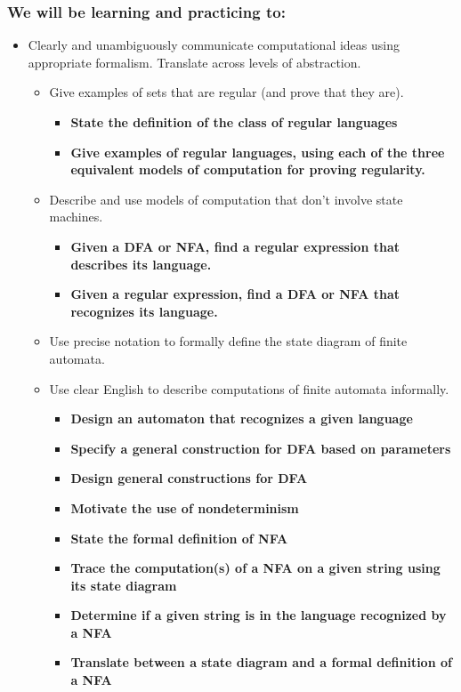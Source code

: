 \documentclass[12pt, oneside]{article}
\begin{document}
\subsubsection*{We will be learning and practicing to:}
\begin{itemize}
\item Clearly and unambiguously communicate computational ideas using appropriate formalism. Translate across levels of abstraction.
\begin{itemize}
   \item Give examples of sets that are regular (and prove that they are).
   \begin{itemize}
      \item {\bf State the definition of the class of regular languages}
      \item {\bf Give examples of regular languages, using each of the three equivalent models of computation for proving regularity.}
   \end{itemize}
   \item Describe and use models of computation that don't involve state machines.
   \begin{itemize}
      \item {\bf Given a DFA or NFA, find a regular expression that describes its language.}
      \item {\bf Given a regular expression, find a DFA or NFA that recognizes its language.}
   \end{itemize}
   \item Use precise notation to formally define the state diagram of finite automata.
   \item Use clear English to describe computations of finite automata informally.
   \begin{itemize}
      \item {\bf Design an automaton that recognizes a given language}
      \item {\bf Specify a general construction for DFA based on parameters}
      \item {\bf Design general constructions for DFA}
      \item {\bf Motivate the use of nondeterminism}
      \item {\bf State the formal definition of NFA}   
      \item {\bf Trace the computation(s) of a NFA on a given string using its state diagram}
      \item {\bf Determine if a given string is in the language recognized by a NFA}
      \item {\bf Translate between a state diagram and a formal definition of a NFA}
   \end{itemize}
\end{itemize}





\end{itemize}
\end{document}
